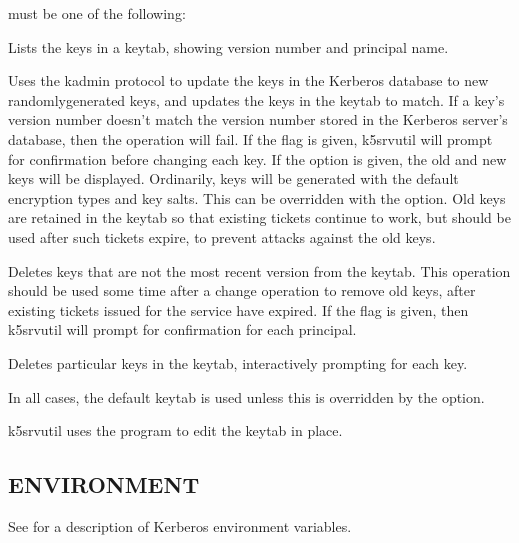 \documentclass[letterpaper,10pt,english]{sphinxmanual}
\begin{document}
\sphinxAtStartPar
{} must be one of the following:
\begin{description}
\sphinxAtStartPar
Lists the keys in a keytab, showing version number and principal
name.

\sphinxAtStartPar
Uses the kadmin protocol to update the keys in the Kerberos
database to new randomly\sphinxhyphen{}generated keys, and updates the keys in
the keytab to match.  If a key’s version number doesn’t match the
version number stored in the Kerberos server’s database, then the
operation will fail.  If the  flag is given, k5srvutil will
prompt for confirmation before changing each key.  If the 
option is given, the old and new keys will be displayed.
Ordinarily, keys will be generated with the default encryption
types and key salts.  This can be overridden with the 
option.  Old keys are retained in the keytab so that existing
tickets continue to work, but  should be used after
such tickets expire, to prevent attacks against the old keys.

\sphinxAtStartPar
Deletes keys that are not the most recent version from the keytab.
This operation should be used some time after a change operation
to remove old keys, after existing tickets issued for the service
have expired.  If the  flag is given, then k5srvutil will
prompt for confirmation for each principal.

\sphinxAtStartPar
Deletes particular keys in the keytab, interactively prompting for
each key.

\end{description}

\sphinxAtStartPar
In all cases, the default keytab is used unless this is overridden by
the  option.

\sphinxAtStartPar
k5srvutil uses the {\hyperref[\detokenize{admin/admin_commands/kadmin_local:kadmin-1}]{}} program to edit the keytab in
place.


\subsection{ENVIRONMENT}
\label{\detokenize{admin/admin_commands/k5srvutil:environment}}
\sphinxAtStartPar
See  for a description of Kerberos environment
variables.
\end{document}
